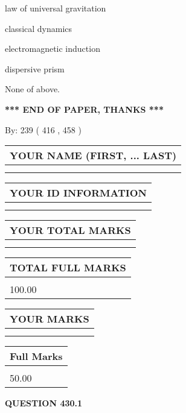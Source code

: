 \documentclass[12pt]{article}
\begin{document}
 
law of universal gravitation
 
 
classical dynamics
 
 
electromagnetic induction
 
 
dispersive prism
 
 
 None of above.
 
 
   
   
\vspace{1.0in} 
{\textbf{\large{ *** END OF PAPER, THANKS *** }}} 
   
   
\hspace{1.0in} By: 
 239 ( 416 ,  458 )
   
   
   
   
\newpage 
\setcounter{page}{ 
   430001 } 
   
   
   
   
\noindent\begin{tabular}{|l|}
\hline
YOUR NAME (FIRST, ... LAST)  \\
\hline
 \\ 
 \\ 
\hline
\end{tabular}
\hspace{0.05in} \begin{tabular}{|l|}
\hline
 YOUR   ID   INFORMATION  \\
\hline
 \\ 
 \\ 
\hline
\end{tabular}
   
   
\vspace{0.2in}\noindent\begin{tabular}{|l|}
\hline
YOUR TOTAL MARKS  \\
\hline
 \\ 
 \\ 
\hline
\end{tabular}
\hspace{0.05in} \begin{tabular}{|l|}
\hline
TOTAL FULL MARKS  \\
\hline
 \\ 
100.00 \\
\hline
\end{tabular}
  
\vspace{0.2in}
  
\noindent\begin{tabular}{|l|}
\hline
 YOUR MARKS  \\
\hline
 \\ 
 \\ 
\hline
\end{tabular}
\hspace{0.05in} \begin{tabular}{|l|}
\hline
 Full Marks  \\
\hline
 \\ 
50.00 \\
\hline
\end{tabular}
{\textbf{\Large{QUESTION
430.1 
}}}
  
\end{document}
